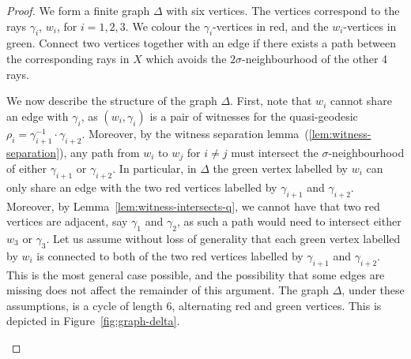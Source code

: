 \documentclass[11pt,a4paper]{amsart}
\theoremstyle{definition}
\begin{document}
\begin{proof}
    We form a finite graph $\Delta$ with six vertices. The vertices correspond to the rays $\gamma_i$, $w_i$, for $i = 1,2,3$. We colour the $\gamma_i$-vertices in red, and the $w_i$-vertices in green. Connect two vertices together with an edge if there exists a path between the corresponding rays in $X$ which avoids the $2\sigma$-neighbourhood of the other 4 rays.

    We now describe the structure of the graph $\Delta$. First, note that $w_i$ cannot share an edge with $\gamma_i$, as $(w_i,\gamma_i)$ is a pair of witnesses for the quasi-geodesic $\rho_i = \gamma_{i+1}^{-1} \cdot \gamma_{i+2}$. 
    Moreover, by the witness separation lemma~(\ref{lem:witness-separation}), any path from $w_i$ to $w_j$ for $i \neq j$ must intersect the $\sigma$-neighbourhood of either $\gamma_{i+1}$ or $\gamma_{i+2}$. In particular, in $\Delta$ the green vertex labelled by $w_i$ can only share an edge with the two red vertices labelled by $\gamma_{i+1}$ and $\gamma_{i+2}$.
    Moreover, by Lemma~\ref{lem:witness-intersects-q}, we cannot have that two red vertices are adjacent, say $\gamma_1$ and $\gamma_2$, as such a path would need to intersect either $w_3$ or $\gamma_3$. 
    Let us assume without loss of generality that each green vertex labelled by $w_i$ is connected to both of the two red vertices labelled by $\gamma_{i+1}$ and $\gamma_{i+2}$. This is the most general case possible, and the possibility that some edges are missing does not affect the remainder of this argument. The graph $\Delta$, under these assumptions, is a cycle  of length 6, alternating red and green vertices. This is depicted in Figure~\ref{fig:graph-delta}. 

    \begin{figure}[ht]
        \centering



\begin{tikzpicture}[x=0.75pt,y=0.75pt,yscale=-1,xscale=1]


\end{tikzpicture}
\end{figure}
\end{proof}
\end{document}
